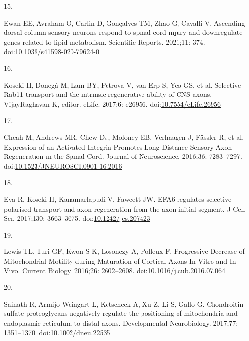 \documentclass[
  12pt,
  a4paper,
]{book}
\newlength{\cslhangindent}
\newlength{\csllabelwidth}
\newlength{\cslentryspacingunit} %
\newenvironment{CSLReferences}[2] %
 {%
  \setlength{\parindent}{0pt}
  \ifodd #1
  \let\oldpar\par
  \def\par{\hangindent=\cslhangindent\oldpar}
  \fi
  \setlength{\parskip}{#2\cslentryspacingunit}
 }%
 {}
\newcommand{\CSLLeftMargin}[1]{\parbox[t]{\csllabelwidth}{#1}}
\newcommand{\CSLRightInline}[1]{\parbox[t]{\linewidth - \csllabelwidth}{#1}\break}
\begin{document}
\begin{CSLReferences}{0}{0}
\leavevmode{}%
\CSLLeftMargin{15. }%
\CSLRightInline{Ewan EE, Avraham O, Carlin D, Gonçalves TM, Zhao G, Cavalli V. Ascending dorsal column sensory neurons respond to spinal cord injury and downregulate genes related to lipid metabolism. Scientific Reports. 2021;11: 374. doi:\href{https://doi.org/10.1038/s41598-020-79624-0}{10.1038/s41598-020-79624-0}}

\leavevmode{}%
\CSLLeftMargin{16. }%
\CSLRightInline{Koseki H, Donegá M, Lam BY, Petrova V, van Erp S, Yeo GS, et al. Selective Rab11 transport and the intrinsic regenerative ability of {CNS} axons. VijayRaghavan K, editor. eLife. 2017;6: e26956. doi:\href{https://doi.org/10.7554/eLife.26956}{10.7554/eLife.26956}}

\leavevmode{}%
\CSLLeftMargin{17. }%
\CSLRightInline{Cheah M, Andrews MR, Chew DJ, Moloney EB, Verhaagen J, Fässler R, et al. Expression of an {Activated Integrin Promotes Long-Distance Sensory Axon Regeneration} in the {Spinal Cord}. Journal of Neuroscience. 2016;36: 7283--7297. doi:\href{https://doi.org/10.1523/JNEUROSCI.0901-16.2016}{10.1523/JNEUROSCI.0901-16.2016}}

\leavevmode{}%
\CSLLeftMargin{18. }%
\CSLRightInline{Eva R, Koseki H, Kanamarlapudi V, Fawcett JW. {EFA6} regulates selective polarised transport and axon regeneration from the axon initial segment. J Cell Sci. 2017;130: 3663--3675. doi:\href{https://doi.org/10.1242/jcs.207423}{10.1242/jcs.207423}}

\leavevmode{}%
\CSLLeftMargin{19. }%
\CSLRightInline{Lewis TL, Turi GF, Kwon S-K, Losonczy A, Polleux F. Progressive {Decrease} of {Mitochondrial Motility} during {Maturation} of {Cortical Axons In Vitro} and {In Vivo}. Current Biology. 2016;26: 2602--2608. doi:\href{https://doi.org/10.1016/j.cub.2016.07.064}{10.1016/j.cub.2016.07.064}}

\leavevmode{}%
\CSLLeftMargin{20. }%
\CSLRightInline{Sainath R, Armijo-Weingart L, Ketscheck A, Xu Z, Li S, Gallo G. Chondroitin sulfate proteoglycans negatively regulate the positioning of mitochondria and endoplasmic reticulum to distal axons. Developmental Neurobiology. 2017;77: 1351--1370. doi:\href{https://doi.org/10.1002/dneu.22535}{10.1002/dneu.22535}}


\end{CSLReferences}
\end{document}
